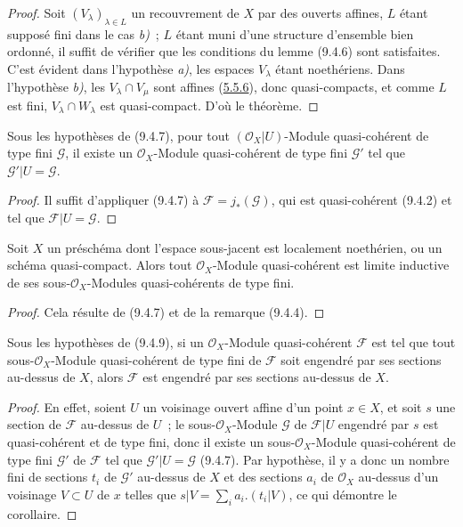 
\begin{proof}
Soit $(V_\lambda)_{\lambda\in L}$ un recouvrement de $X$ par des ouverts
affines, $L$ étant supposé fini dans le cas \emph{b)}~; $L$ étant muni d'une
structure d'ensemble bien ordonné, il suffit de vérifier que les conditions
du lemme (9.4.6) sont satisfaites. C'est évident dans l'hypothèse \emph{a)}, les
espaces $V_\lambda$ étant noethériens. Dans l'hypothèse \emph{b)}, les
$V_\lambda\cap V_\mu$ sont affines (\hyperref[I.5.5.6-fr]{5.5.6}), donc
quasi-compacts, et comme $L$ est fini, $V_\lambda\cap W_\lambda$ est
quasi-compact. D'où le théorème.
\end{proof}

\begin{corollary}[9.4.8]
\label{I.9.4.8-fr}
Sous les hypothèses de (9.4.7), pour tout $(\mathscr{O}_X|U)$-Module
quasi-cohérent de type fini $\mathscr{G}$, il existe un
$\mathscr{O}_X$-Module quasi-cohérent de type fini $\mathscr{G}'$ tel que
$\mathscr{G}'|U=\mathscr{G}$.
\end{corollary}

\begin{proof}
Il suffit d'appliquer (9.4.7) à $\mathscr{F}=j_*(\mathscr{G})$, qui est
quasi-cohérent (9.4.2) et tel que $\mathscr{F}|U=\mathscr{G}$.
\end{proof}

\begin{corollary}[9.4.9]
\label{I.9.4.9-fr}
Soit $X$ un préschéma dont l'espace sous-jacent est localement noethérien, ou
un schéma quasi-compact. Alors tout $\mathscr{O}_X$-Module quasi-cohérent est
limite inductive de ses sous-$\mathscr{O}_X$-Modules quasi-cohérents de type
fini.
\end{corollary}

\begin{proof}
Cela résulte de (9.4.7) et de la remarque (9.4.4).
\end{proof}

\begin{corollary}[9.4.10]
\label{I.9.4.10-fr}
Sous les hypothèses de (9.4.9), si un $\mathscr{O}_X$-Module quasi-cohérent
$\mathscr{F}$ est tel que tout sous-$\mathscr{O}_X$-Module quasi-cohérent de
type fini de $\mathscr{F}$ soit engendré par ses sections au-dessus de $X$,
alors $\mathscr{F}$ est engendré par ses sections au-dessus de $X$.
\end{corollary}

\begin{proof}
En effet, soient $U$ un voisinage ouvert affine d'un point $x\in X$, et soit
$s$ une section de $\mathscr{F}$ au-dessus de $U$~; le
sous-$\mathscr{O}_X$-Module $\mathscr{G}$ de $\mathscr{F}|U$ engendré par
$s$ est quasi-cohérent et de type fini, donc il existe un
sous-$\mathscr{O}_X$-Module quasi-cohérent de type fini $\mathscr{G}'$ de
$\mathscr{F}$ tel que $\mathscr{G}'|U=\mathscr{G}$ (9.4.7). Par hypothèse,
il y a donc un nombre fini de sections $t_i$ de $\mathscr{G}'$ au-dessus de
$X$ et des sections $a_i$ de $\mathscr{O}_X$ au-dessus d'un voisinage
$V\subset U$ de $x$ telles que
$s|V=\sum_i a_i.(t_i|V)$, ce qui démontre le corollaire.
\end{proof}

